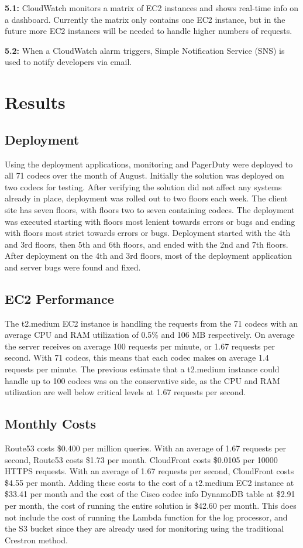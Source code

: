 \documentclass[letterpaper,12pt]{article}
\begin{document}
\textbf{5.1:} CloudWatch monitors a matrix of EC2 instances and shows real-time info on a dashboard. Currently the matrix only contains one EC2 instance, but in the future more EC2 instances will be needed to handle higher numbers of requests.

\textbf{5.2:} When a CloudWatch alarm triggers, Simple Notification Service (SNS) is used to notify developers via email.



\section{Results}
\subsection{Deployment}
Using the deployment applications, monitoring and PagerDuty were deployed to all 71 codecs over the month of August. Initially the solution was deployed on two codecs for testing. After verifying the solution did not affect any systems already in place, deployment was rolled out to two floors each week. The client site has seven floors, with floors two to seven containing codecs. The deployment was executed starting with floors most lenient towards errors or bugs and ending with floors most strict towards errors or bugs. Deployment started with the 4th and 3rd floors, then 5th and 6th floors, and ended with the 2nd and 7th floors. After deployment on the 4th and 3rd floors, most of the deployment application and server bugs were found and fixed.

\subsection{EC2 Performance}
The t2.medium EC2 instance is handling the requests from the 71 codecs with an average CPU and RAM utilization of 0.5\% and 106 MB respectively. On average the server receives on average 100 requests per minute, or 1.67 requests per second. With 71 codecs, this means that each codec makes on average 1.4 requests per minute. The previous estimate that a t2.medium instance could handle up to 100 codecs was on the conservative side, as the CPU and RAM utilization are well below critical levels at 1.67 requests per second.

\subsection{Monthly Costs}
Route53 costs \$0.400 per million queries. With an average of 1.67 requests per second, Route53 costs \$1.73 per month. CloudFront costs \$0.0105 per 10000 HTTPS requests. With an average of 1.67 requests per second, CloudFront costs \$4.55 per month. Adding these costs to the cost of a t2.medium EC2 instance at \$33.41 per month and the cost of the Cisco codec info DynamoDB table at \$2.91 per month, the cost of running the entire solution is \$42.60 per month. This does not include the cost of running the Lambda function for the log processor, and the S3 bucket since they are already used for monitoring using the traditional Crestron method. 
\end{document}

